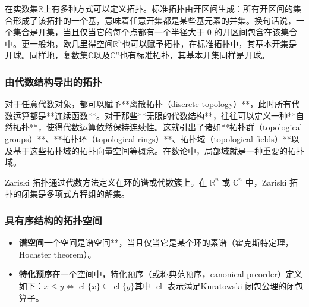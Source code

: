 在实数集$\mathbb{R}$上有多种方式可以定义拓扑。标准拓扑由开区间生成：所有开区间的集合形成了该拓扑的一个基，意味着任意开集都是某些基元素的并集。换句话说，一个集合是开集，当且仅当它的每个点都有一个半径大于 0 的开区间包含在该集合中。更一般地，欧几里得空间$\mathbb{R}^n$也可以赋予拓扑，在标准拓扑中，其基本开集是开球。同样地，复数集$\mathbb{C}$以及$\mathbb{C}^n$也有标准拓扑，其基本开集同样是开球。
\subsubsection{由代数结构导出的拓扑}
对于任意代数对象，都可以赋予**离散拓扑（discrete topology）**，此时所有代数运算都是**连续函数**。对于那些**无限的代数结构**，往往可以定义一种**自然拓扑**，使得代数运算依然保持连续性。这就引出了诸如**拓扑群（topological groups）**、**拓扑环（topological rings）**、\*\*拓扑域（topological fields）**以及基于这些拓扑域的拓扑向量空间等概念。在数论中，局部域就是一种重要的拓扑域。

Zariski 拓扑通过代数方法定义在环的谱或代数簇上。在 $\mathbb{R}^n$ 或 $\mathbb{C}^n$ 中，Zariski 拓扑的闭集是多项式方程组的解集。
\subsubsection{具有序结构的拓扑空间}

\begin{itemize}
\item \textbf{谱空间}一个空间是谱空间**，当且仅当它是某个环的素谱（霍克斯特定理，Hochster theorem）。
\item \textbf{特化预序}在一个空间中，特化预序（或称典范预序，canonical preorder）定义如下：$x \leq y \iff \operatorname{cl}\{x\} \subseteq \operatorname{cl}\{y\}$其中 $\operatorname{cl}$ 表示满足Kuratowski 闭包公理的闭包算子。
\end{itemize}